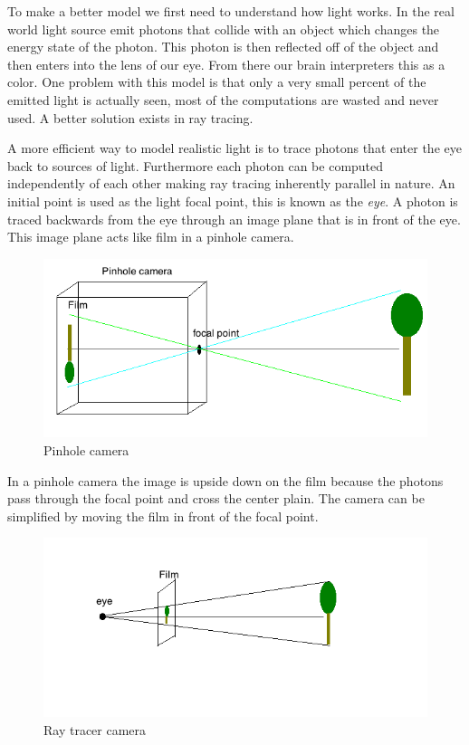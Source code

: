 \documentclass[11pt,a4paper,oneside]{article}
\begin{document}
To make a better model we first need to understand how light works.  In the real world light source emit photons that collide with an object which changes the energy state of the photon.  This photon is then reflected off of the object and then enters into the lens of our eye.  From there our brain interpreters this as a color.  One problem with this model is that only a very small percent of the emitted light is actually seen, most of the computations are wasted and never used.  A better solution exists in ray tracing.  

A more efficient way to model realistic light is to trace photons that enter the eye back to sources of light.  Furthermore each photon can be computed independently of each other making ray tracing inherently parallel in nature.  An initial point is used as the light focal point, this is known as the \textit{eye}.  A photon is traced backwards from the eye through an image plane that is in front of the eye.  This image plane acts like film in a pinhole camera.  

\begin{figure}[H]
\includegraphics[scale=0.6]{pineholecamera.png} 
\caption{Pinhole camera}
\label{pinhole-camera}
\end{figure}

In a pinhole camera the image is upside down on the film because the photons pass through the focal point and cross the center plain.  The camera can be simplified by moving the film in front of the focal point.

 \begin{figure}[H]
\includegraphics[scale=0.6]{raycamera.png} 
\caption{Ray tracer camera}
\label{ray-camera}
\end{figure}
\end{document}

